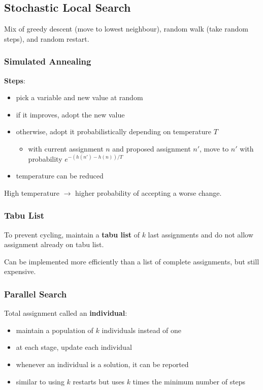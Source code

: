 \documentclass[11pt]{article}
\begin{document}
\subsection{Stochastic Local Search}
\label{sec:orgc25d632}
Mix of greedy descent (move to lowest neighbour), random walk (take random steps), and random restart.
\subsubsection{Simulated Annealing}
\label{sec:orgd631a49}
\textbf{Steps}:
\begin{itemize}
\item pick a variable and new value at random
\item if it improves, adopt the new value
\item otherwise, adopt it probabilistically depending on temperature \(T\)
\begin{itemize}
\item with current assignment \(n\) and proposed assignment \(n'\), move to \(n'\) with probability
\(e^{-(h(n') - h(n))/T}\)
\end{itemize}
\item temperature can be reduced
\end{itemize}

High temperature \(\to\) higher probability of accepting a worse change.
\subsubsection{Tabu List}
\label{sec:org2e21d90}
To prevent cycling, maintain a \textbf{tabu list} of \(k\) last assignments and do not allow assignment
already on tabu list.

Can be implemented more efficiently than a list of complete assignments, but still expensive.
\subsubsection{Parallel Search}
\label{sec:org5212d48}
Total assignment called an \textbf{individual}:
\begin{itemize}
\item maintain a population of \(k\) individuals instead of one
\item at each stage, update each individual
\item whenever an individual is a solution, it can be reported
\item similar to using \(k\) restarts but uses \(k\) times the minimum number of steps
\end{itemize}
\end{document}
